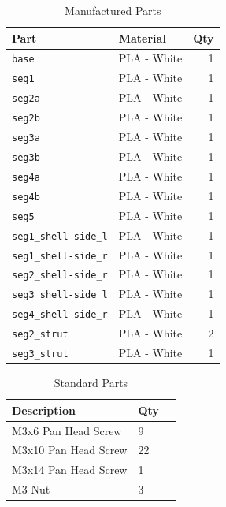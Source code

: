 \documentclass[a4paper,11pt]{article}
\begin{document}
\begin{table}[H]
    \centering
    \caption{Manufactured Parts}
    \label{tab:bom_manufactured}
    \begin{tabularx}{\textwidth}{@{} l X r @{}}
        \toprule
        \textbf{Part} & \textbf{Material} & \textbf{Qty} \\
        \midrule
        \texttt{base}                   & PLA - White & 1 \\
        \texttt{seg1}                   & PLA - White & 1 \\
        \texttt{seg2a}                  & PLA - White & 1 \\
        \texttt{seg2b}                  & PLA - White & 1 \\
        \texttt{seg3a}                  & PLA - White & 1 \\
        \texttt{seg3b}                  & PLA - White & 1 \\
        \texttt{seg4a}                  & PLA - White & 1 \\
        \texttt{seg4b}                  & PLA - White & 1 \\
        \texttt{seg5}                   & PLA - White & 1 \\
        \texttt{seg1\_shell-side\_l}    & PLA - White & 1 \\
        \texttt{seg1\_shell-side\_r}    & PLA - White & 1 \\
        \texttt{seg2\_shell-side\_r}    & PLA - White & 1 \\
        \texttt{seg3\_shell-side\_l}    & PLA - White & 1 \\
        \texttt{seg4\_shell-side\_r}    & PLA - White & 1 \\
        \texttt{seg2\_strut}            & PLA - White & 2 \\
        \texttt{seg3\_strut}            & PLA - White & 1 \\
        \bottomrule
    \end{tabularx}
\end{table}

\begin{table}[H]
    \centering
    \caption{Standard Parts}
    \label{tab:bom_fasteners}
    \begin{tabularx}{\textwidth}{@{} l X r @{}}
        \toprule
        \textbf{Description} & \textbf{Qty} \\
        \midrule
        M3x6 Pan Head Screw  & 9  \\
        M3x10 Pan Head Screw & 22 \\
        M3x14 Pan Head Screw & 1  \\
        M3 Nut               & 3  \\
        \bottomrule
    \end{tabularx}
\end{table}
\end{document}

